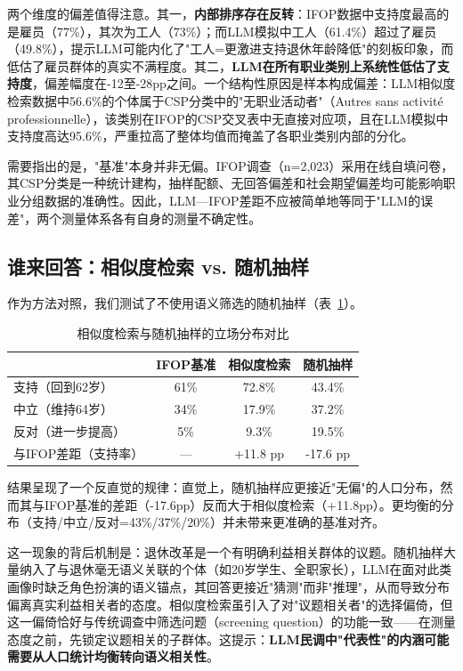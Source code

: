\documentclass[11pt,a4paper]{ctexart}
\begin{document}
两个维度的偏差值得注意。其一，\textbf{内部排序存在反转}：IFOP数据中支持度最高的是雇员（77\%），其次为工人（73\%）；而LLM模拟中工人（61.4\%）超过了雇员（49.8\%），提示LLM可能内化了"工人=更激进支持退休年龄降低"的刻板印象，而低估了雇员群体的真实不满程度。其二，\textbf{LLM在所有职业类别上系统性低估了支持度}，偏差幅度在-12至-28pp之间。一个结构性原因是样本构成偏差：LLM相似度检索数据中56.6\%的个体属于CSP分类中的"无职业活动者"（Autres sans activité professionnelle），该类别在IFOP的CSP交叉表中无直接对应项，且在LLM模拟中支持度高达95.6\%，严重拉高了整体均值而掩盖了各职业类别内部的分化。

需要指出的是，"基准"本身并非无偏。IFOP调查（n=2,023）采用在线自填问卷，其CSP分类是一种统计建构，抽样配额、无回答偏差和社会期望偏差均可能影响职业分组数据的准确性。因此，LLM—IFOP差距不应被简单地等同于"LLM的误差"，两个测量体系各有自身的测量不确定性。

\subsection{谁来回答：相似度检索 vs. 随机抽样}

作为方法对照，我们测试了不使用语义筛选的随机抽样（表~\ref{tab:sampling_comparison}）。

\begin{table}[H]
    \centering
    \caption{相似度检索与随机抽样的立场分布对比}
    \label{tab:sampling_comparison}
    \begin{tabular}{@{}lccc@{}}
        \toprule
        & \textbf{IFOP基准} & \textbf{相似度检索} & \textbf{随机抽样} \\
        \midrule
        支持（回到62岁） & 61\% & 72.8\% & 43.4\% \\
        中立（维持64岁） & 34\% & 17.9\% & 37.2\% \\
        反对（进一步提高） & 5\% & 9.3\% & 19.5\% \\
        \midrule
        与IFOP差距（支持率） & --- & +11.8 pp & -17.6 pp \\
        \bottomrule
    \end{tabular}
\end{table}

结果呈现了一个反直觉的规律：直觉上，随机抽样应更接近"无偏"的人口分布，然而其与IFOP基准的差距（-17.6pp）反而大于相似度检索（+11.8pp）。更均衡的分布（支持/中立/反对=43\%/37\%/20\%）并未带来更准确的基准对齐。

这一现象的背后机制是：退休改革是一个有明确利益相关群体的议题。随机抽样大量纳入了与退休毫无语义关联的个体（如20岁学生、全职家长），LLM在面对此类画像时缺乏角色扮演的语义锚点，其回答更接近"猜测"而非"推理"，从而导致分布偏离真实利益相关者的态度。相似度检索虽引入了对"议题相关者"的选择偏倚，但这一偏倚恰好与传统调查中筛选问题（screening question）的功能一致——在测量态度之前，先锁定议题相关的子群体。这提示：\textbf{LLM民调中"代表性"的内涵可能需要从人口统计均衡转向语义相关性}。
\end{document}
